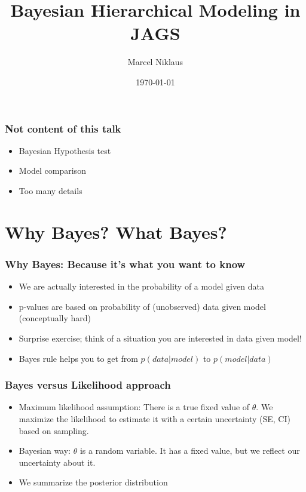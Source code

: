 \documentclass[hyperref={pdfpagelabels=false},unknownkeysallowed]{beamer}
\title{Bayesian Hierarchical Modeling in JAGS}
\author{Marcel Niklaus}
\date{\today}
\begin{document}
	
\begin{frame}
\titlepage
\end{frame} 

\begin{frame}	 
	 \tableofcontents
\end{frame}


\begin{frame}
	\frametitle{Not content of this talk}
	\begin{itemize}
	\item Bayesian Hypothesis test
	\item Model comparison
    \item Too many details
\end{itemize} 
	\note{}
\end{frame}

\section{Why Bayes? What Bayes?}
\begin{frame}
	\frametitle{Why Bayes: Because it's what you want to know}
	
	\begin{itemize}
	\item We are actually interested in the probability of a model given data
	\item p-values are based on probability of (unobserved) data given model (conceptually hard) 
	\pause
	\item Surprise exercise; think of a situation you are interested in data given model!
	\pause
	\item Bayes rule helps you to get from $p(data|model)$ to $p(model|data)$ 
	\end{itemize} 
	
\end{frame}


\begin{frame}
	\frametitle{Bayes versus Likelihood approach}
	\begin{itemize}
	\item Maximum likelihood assumption: There is a true fixed value of $\theta$. We maximize the likelihood to estimate it with a certain uncertainty (SE, CI) based on sampling. 
	\item Bayesian way: $\theta$ is a random variable. It has a fixed value, but we reflect our uncertainty about it. 
	\item We summarize the posterior distribution
	\end{itemize} 
\end{frame}
\end{document}
